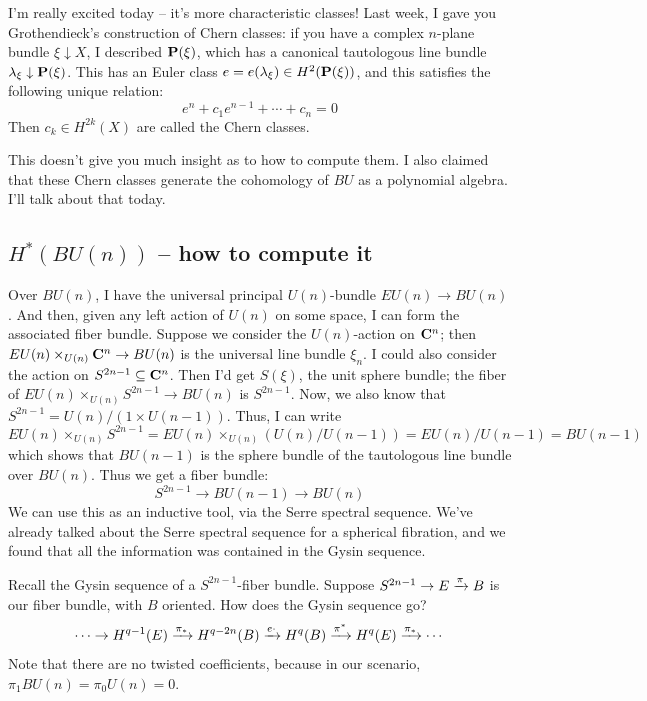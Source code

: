 I'm really excited today -- it's more characteristic classes!
Last week, I gave you Grothendieck's construction of Chern classes:
if you have a complex $n$-plane bundle $\xi\downarrow X$, I described $\mathbf P(\xi)$, which has a canonical tautologous line bundle $\lambda_\xi\downarrow \mathbf P(\xi)$.
This has an Euler class $e=e(\lambda_\xi)\in H^2(\mathbf P(\xi))$, and this satisfies the following unique relation:
$$
e^n+c_1e^{n-1} + \cdots + c_n = 0
$$
Then $c_k\in H^{2k}(X)$ are called the Chern classes.

This doesn't give you much insight as to how to compute them.
I also claimed that these Chern classes generate the cohomology of $BU$ as a polynomial algebra.
I'll talk about that today.
\subsection{$H^\ast(BU(n))$ -- how to compute it}
Over $BU(n)$, I have the universal principal $U(n)$-bundle $EU(n)\to BU(n)$.
And then, given any left action of $U(n)$ on some space, I can form the associated fiber bundle.
Suppose we consider the $U(n)$-action on $\mathbf C^n$; then $EU(n)\times_{U(n)}\mathbf C^n\to BU(n)$ is the universal line bundle $\xi_n$.
I could also consider the action on $S^{2n-1}\subseteq \mathbf C^n$.
Then I'd get $S(\xi)$, the unit sphere bundle; the fiber of $EU(n)\times_{U(n)}S^{2n-1}\to BU(n)$ is $S^{2n-1}$.
Now, we also know that $S^{2n-1} = U(n)/(1\times U(n-1))$.
Thus, I can write
$$EU(n)\times_{U(n)}S^{2n-1} = EU(n)\times_{U(n)} (U(n)/U(n-1)) = EU(n)/U(n-1) = BU(n-1)$$
which shows that $BU(n-1)$ is the sphere bundle of the tautologous line bundle over $BU(n)$.
Thus we get a fiber bundle:
$$
S^{2n-1}\to BU(n-1)\to BU(n)
$$
We can use this as an inductive tool, via the Serre spectral sequence.
We've already talked about the Serre spectral sequence for a spherical fibration, and we found that all the information was contained in the Gysin sequence.

Recall the Gysin sequence of a $S^{2n-1}$-fiber bundle.
Suppose $S^{2n-1}\to E\xrightarrow{{\pi}} B$ is our fiber bundle, with $B$ oriented.
How does the Gysin sequence go?
$$
\cdots\to H^{q-1}(E) \xrightarrow{{\pi_\ast}} H^{q-2n}(B) \xrightarrow{{e\cdot}} H^q(B) \xrightarrow{{\pi^\ast}} H^q(E) \xrightarrow{{\pi_\ast}} \cdots
$$
Note that there are no twisted coefficients, because in our scenario, $\pi_1 BU(n) = \pi_0 U(n) = 0$.


